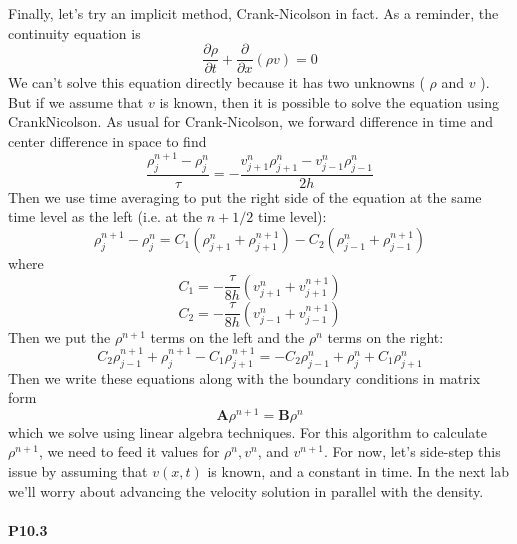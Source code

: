 \documentclass{book}
\theoremstyle{plain}
\theoremstyle{definition}
\numberwithin{exm}{chapter}
\theoremstyle{remark}
\theoremstyle{summary}
\theoremstyle{overview}
\begin{document}
Finally, let\rq s try an implicit method, Crank-Nicolson in fact. As a reminder, the
continuity equation is
\begin{equation}\label{eq:1012}
\frac{\partial \rho}{\partial t}+\frac{\partial}{\partial x}(\rho v)=0
\end{equation}
We can\rq t solve this equation directly because it has two unknowns ( $\rho$ and $v$ ). But if we assume that $v$ is known, then it is possible to solve the equation using CrankNicolson. As usual for Crank-Nicolson, we forward difference in time and center difference in space to find
\begin{equation}\label{eq:1013}
\frac{\rho_{j}^{n+1}-\rho_{j}^{n}}{\tau}=-\frac{v_{j+1}^{n} \rho_{j+1}^{n}-v_{j-1}^{n} \rho_{j-1}^{n}}{2 h}
\end{equation}
Then we use time averaging to put the right side of the equation at the same time
level as the left (i.e. at the $n + 1/2$ time level):
\begin{equation}\label{eq:1014}
\rho_{j}^{n+1}-\rho_{j}^{n}=C_{1}\left(\rho_{j+1}^{n}+\rho_{j+1}^{n+1}\right)-C_{2}\left(\rho_{j-1}^{n}+\rho_{j-1}^{n+1}\right)
\end{equation}
where 
\begin{equation}\label{eq:1015}
C_{1}=-\frac{\tau}{8 h}\left(v_{j+1}^{n}+v_{j+1}^{n+1}\right)
\end{equation}
\begin{equation}\label{eq:1016}
C_{2}=-\frac{\tau}{8 h}\left(v_{j-1}^{n}+v_{j-1}^{n+1}\right)
\end{equation}
Then we put the $\rho^{n+1}$ terms on the left and the $\rho^n$ terms on the right:
\begin{equation}\label{eq:1017}
C_{2} \rho_{j-1}^{n+1}+\rho_{j}^{n+1}-C_{1} \rho_{j+1}^{n+1}=-C_{2} \rho_{j-1}^{n}+\rho_{j}^{n}+C_{1} \rho_{j+1}^{n}
\end{equation}
Then we write these equations along with the boundary conditions in matrix form
\begin{equation}\label{eq:1018}
\mathbf{A} \rho^{n+1}=\mathbf{B} \rho^{n}
\end{equation}
which we solve using linear algebra techniques. For this algorithm to calculate $\rho^{n+1}$, we need to feed it values for $\rho^{n}, v^{n}$, and $v^{n+1}$. For now, let\rq s side-step this issue by assuming that $v(x, t)$ is known, and a constant in time. In the next lab we\rq ll worry about advancing the velocity solution in parallel with the density.
\paragraph*{P10.3}
\end{document}
